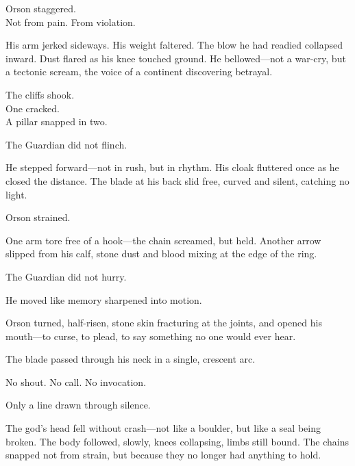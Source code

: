 \documentclass[12pt]{article}
\begin{document}
\vspace{0.5em}
Orson staggered.\\
Not from pain. From violation.

\vspace{0.5em}
His arm jerked sideways. His weight faltered. The blow he had readied collapsed inward. Dust flared as his knee touched ground. He bellowed---not a war-cry, but a tectonic scream, the voice of a continent discovering betrayal.

\vspace{0.5em}
The cliffs shook.\\
One cracked.\\
A pillar snapped in two.

\vspace{0.5em}
The Guardian did not flinch.

\vspace{0.5em}
He stepped forward---not in rush, but in rhythm. His cloak fluttered once as he closed the distance. The blade at his back slid free, curved and silent, catching no light.

\vspace{0.5em}
Orson strained.

\vspace{0.5em}
One arm tore free of a hook---the chain screamed, but held. Another arrow slipped from his calf, stone dust and blood mixing at the edge of the ring.

\vspace{0.5em}
The Guardian did not hurry.

\vspace{0.5em}
He moved like memory sharpened into motion.

\vspace{0.5em}
Orson turned, half-risen, stone skin fracturing at the joints, and opened his mouth---to curse, to plead, to say something no one would ever hear.

\vspace{0.5em}
The blade passed through his neck in a single, crescent arc.

\vspace{0.5em}
No shout. No call. No invocation.

\vspace{0.5em}
Only a line drawn through silence.

\vspace{0.5em}
The god’s head fell without crash---not like a boulder, but like a seal being broken. The body followed, slowly, knees collapsing, limbs still bound. The chains snapped not from strain, but because they no longer had anything to hold.
\end{document}

